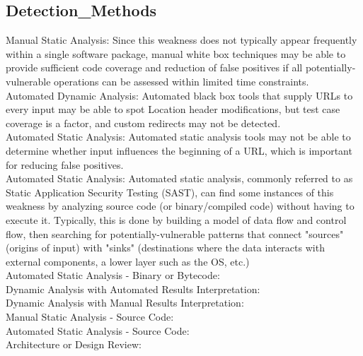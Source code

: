 \subsection*{Detection\_Methods}
Manual Static Analysis: Since this weakness does not typically appear frequently within a single software package, manual white box techniques may be able to provide sufficient code coverage and reduction of false positives if all potentially-vulnerable operations can be assessed within limited time constraints.\\
Automated Dynamic Analysis: Automated black box tools that supply URLs to every input may be able to spot Location header modifications, but test case coverage is a factor, and custom redirects may not be detected.\\
Automated Static Analysis: Automated static analysis tools may not be able to determine whether input influences the beginning of a URL, which is important for reducing false positives.\\
Automated Static Analysis: Automated static analysis, commonly referred to as Static Application Security Testing (SAST), can find some instances of this weakness by analyzing source code (or binary/compiled code) without having to execute it. Typically, this is done by building a model of data flow and control flow, then searching for potentially-vulnerable patterns that connect "sources" (origins of input) with "sinks" (destinations where the data interacts with external components, a lower layer such as the OS, etc.)\\
Automated Static Analysis - Binary or Bytecode: 
                  \\
Dynamic Analysis with Automated Results Interpretation: 
                  \\
Dynamic Analysis with Manual Results Interpretation: 
                  \\
Manual Static Analysis - Source Code: 
                  \\
Automated Static Analysis - Source Code: 
                  \\
Architecture or Design Review: 
                  \\
